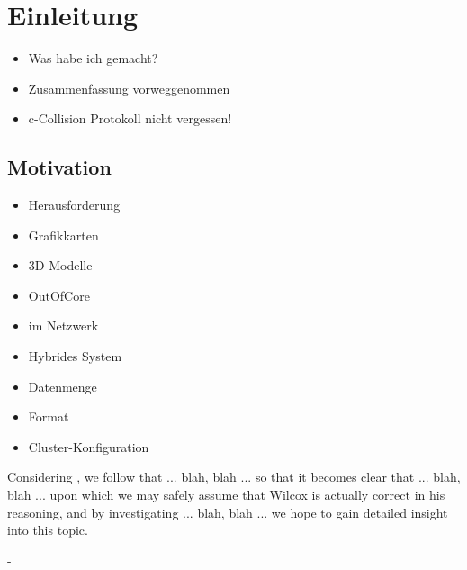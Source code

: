 %
%
%
%
%
%
%
%
%

\chapter{Einleitung}

\begin{itemize}
 \item Was habe ich gemacht?
 \item Zusammenfassung vorweggenommen
 \item c-Collision Protokoll nicht vergessen!
\end{itemize}

\section{Motivation}
\label{introduction:motivation}

\begin{itemize}
 \item Herausforderung
 \item Grafikkarten
 \item 3D-Modelle
 \item OutOfCore
 \item im Netzwerk
 \item Hybrides System
 \item Datenmenge
 \item Format
 \item Cluster-Konfiguration
\end{itemize}

Considering \cite{wilcox}, we follow that ... blah, blah ... so that it becomes
clear that ... blah, blah ... upon which we may safely assume that Wilcox is
actually correct in his reasoning, and by investigating ... blah, blah ...
we hope to gain detailed insight into this topic.

-


%
%
